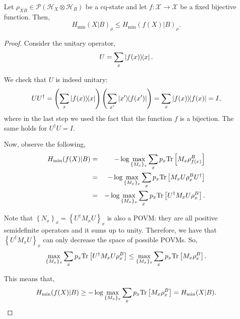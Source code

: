 \begin{lemma}
Let $\rho_{XB} \in \mathcal{P}(\mathcal{H}_{X}\otimes \mathcal{H}_B)$ be a cq-state and let $f:\mathcal{X} \rightarrow \mathcal{X} $ be a fixed bijective function. Then,
$$H_{\min}(X|B)_{\rho} \leq H_{\min}(f(X)|B)_{\rho}.$$
\label{lemma:bijectivefunction}
\end{lemma}
\begin{proof}
Consider the unitary operator,
$$U = \sum_x \ketbra{f(x)}{x}.$$ 

We check that $U$ is indeed unitary:
\begin{equation*}
U U^{\dagger} = \left(\sum_x \ketbra{f(x)}{x}\right)\left(\sum_{x'} \ketbra{x'}{f(x')}\right) 
= \sum_x \ketbra{f(x)} = I,
\end{equation*}
where in the last step we used the fact that the function $f$ is a bijection. The same holds for $U^{\dagger}U = I$.

Now, observe the following,
\begin{eqnarray*}
H_{\min}(f(X)|B) &=& -\log \max_{\{M_x\}_x} \sum_x p_x \text{Tr}\left[M_x \rho_{f(x)}^B\right]\\
&=& -\log \max_{\{M_x\}_x} \sum_x p_x \text{Tr}\left[M_x U \rho_{x}^B U^{\dagger}\right]\\
&=& -\log \max_{\{M_x\}_x} \sum_x p_x \text{Tr}\left[U^{\dagger} M_x U \rho_{x}^B \right]. 
\end{eqnarray*}

Note that $\left\{ N_x \right\}_x= \left\{U^{\dagger} M_x U\right\}_x$ is also a POVM: they are all positive semidefinite operators and it sums up to unity. Therefore, we have that $\left\{U^{\dagger} M_x U\right\}_x$ can only decrease the space of possible POVMs. So, 
$$\max_{\{M_x\}_x} \sum_x p_x \text{Tr}\left[U^{\dagger} M_x U \rho_{x}^B \right] \leq \max_{\{M_x\}_x} \sum_x p_x \text{Tr}\left[ M_x \rho_{x}^B \right].$$

This means that, 
\begin{equation*}
H_{\min}(f(X)|B) \geq -\log \max_{\{M_x\}_x} \sum_x p_x \text{Tr}\left[ M_x \rho_{x}^B \right] = H_{\min}(X|B).
\end{equation*}
\end{proof}



